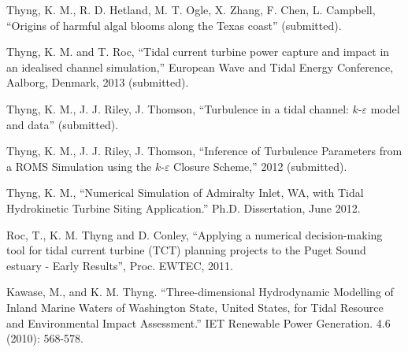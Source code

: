 \documentclass[10pt,letterpaper]{article}
\renewenvironment{itemize}{
  \begin{list}{}{
    \setlength{\leftmargin}{1.5em}
    \setlength{\itemsep}{0.25em}
    \setlength{\parskip}{0pt}
    \setlength{\parsep}{0.25em}
  }
}{
  \end{list}
}
\begin{document}
\begin{itemize}


\item Thyng, K. M., R. D. Hetland, M. T. Ogle, X. Zhang, F. Chen, L. Campbell, ``Origins of harmful algal blooms along the Texas coast'' (submitted).

\item Thyng, K. M. and T. Roc, ``Tidal current turbine power capture and impact in an idealised channel simulation,'' European Wave and Tidal Energy Conference, Aalborg, Denmark, 2013 (submitted).

\item Thyng, K. M., J. J. Riley, J. Thomson, ``Turbulence in a tidal channel: $k$-$\varepsilon$ model and data'' (submitted).

\item Thyng, K. M., J. J. Riley, J. Thomson, ``Inference of Turbulence Parameters from a ROMS Simulation using the $k$-$\varepsilon$ Closure Scheme,'' 2012 (submitted).

\item Thyng, K. M., ``Numerical Simulation of Admiralty Inlet, WA, with Tidal Hydrokinetic Turbine Siting Application.'' Ph.D. Dissertation, June 2012.

\item Roc, T., K. M. Thyng and D. Conley, ``Applying a numerical decision-making tool for tidal current turbine (TCT) planning projects to the Puget Sound estuary - Early Results'', Proc. EWTEC, 2011.

\item Kawase, M., and K. M. Thyng. ``Three-dimensional Hydrodynamic Modelling of Inland Marine Waters of Washington State, United States, for Tidal Resource and Environmental Impact Assessment.'' IET Renewable Power Generation. 4.6 (2010): 568-578. 


\end{itemize}
\end{document}
